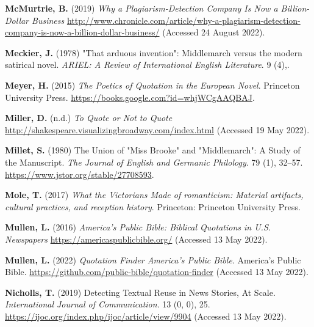 \documentclass[
]{article}
\newlength{\cslhangindent}
\newlength{\cslentryspacingunit} %
\newenvironment{CSLReferences}[2] %
 {%
  \setlength{\parindent}{0pt}
  \ifodd #1
  \let\oldpar\par
  \def\par{\hangindent=\cslhangindent\oldpar}
  \fi
  \setlength{\parskip}{#2\cslentryspacingunit}
 }%
 {}
\begin{document}
\begin{CSLReferences}{1}{0}
\leavevmode{}%
\textbf{McMurtrie, B.} (2019) \emph{Why a {Plagiarism-Detection Company
Is Now} a {Billion-Dollar Business}}
\url{http://www.chronicle.com/article/why-a-plagiarism-detection-company-is-now-a-billion-dollar-business/}
(Accessed 24 August 2022).

\leavevmode{}%
\textbf{Meckier, J.} (1978) "That arduous invention": Middlemarch versus
the modern satirical novel. \emph{ARIEL: A Review of International
English Literature}. 9 (4),.

\leavevmode{}%
\textbf{Meyer, H.} (2015) \emph{The {Poetics} of {Quotation} in the
{European Novel}}. {Princeton University Press}.
\url{https://books.google.com?id=whjWCgAAQBAJ}.

\leavevmode{}%
\textbf{Miller, D.} (n.d.) \emph{To {Quote} or {Not} to {Quote}}
\url{http://shakespeare.visualizingbroadway.com/index.html} (Accessed 19
May 2022).

\leavevmode{}%
\textbf{Millet, S.} (1980) The {Union} of "{Miss Brooke}" and
"{Middlemarch}": {A Study} of the {Manuscript}. \emph{The Journal of
English and Germanic Philology}. 79 (1), 32--57.
\url{https://www.jstor.org/stable/27708593}.

\leavevmode{}%
\textbf{Mole, T.} (2017) \emph{What the {Victorians Made} of
romanticism: Material artifacts, cultural practices, and reception
history}. {Princeton}: {Princeton University Press}.

\leavevmode{}%
\textbf{Mullen, L.} (2016) \emph{America's {Public Bible}: {Biblical
Quotations} in {U}.{S}. {Newspapers}}
\url{https://americaspublicbible.org/} (Accessed 13 May 2022).

\leavevmode{}%
\textbf{Mullen, L.} (2022) \emph{Quotation {Finder} \textbar{}
{America}'s {Public Bible}}. {America's Public Bible}.
\url{https://github.com/public-bible/quotation-finder} (Accessed 13 May
2022).

\leavevmode{}%
\textbf{Nicholls, T.} (2019) Detecting {Textual Reuse} in {News
Stories}, {At Scale}. \emph{International Journal of Communication}. 13
(0, 0), 25. \url{https://ijoc.org/index.php/ijoc/article/view/9904}
(Accessed 13 May 2022).


\end{CSLReferences}
\end{document}
